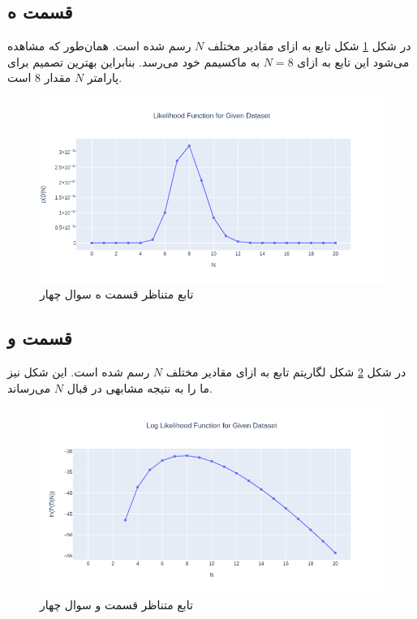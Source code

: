 \documentclass{article}
\begin{document}
\subsection*{قسمت ه}

در شکل \ref{likelihood} شکل تابع  به ازای مقادیر مختلف $N$ رسم شده است. همان‌طور
که مشاهده می‌شود این تابع به ازای $N=8$ به ماکسیمم خود می‌رسد. بنابراین بهترین تصمیم برای
پارامتر $N$ مقدار $8$ است.

\begin{figure}[h]
    \centering
    \includegraphics[scale=0.3]{images/q4/likelihood.png}
    \caption{تابع  متناظر قسمت ه سوال چهار}
    \label{likelihood}
\end{figure}

\subsection*{قسمت و}

در شکل \ref{log-likelihood} شکل لگاریتم تابع  به ازای مقادیر مختلف $N$ رسم شده است.
این شکل نیز ما را به نتیجه مشابهی در قبال $N$ می‌رساند.

\begin{figure}[h]
    \centering
    \includegraphics[scale=0.3]{images/q4/log_likelihood.png}
    \caption{تابع  متناظر قسمت و سوال چهار}
    \label{log-likelihood}
\end{figure}
\end{document}
